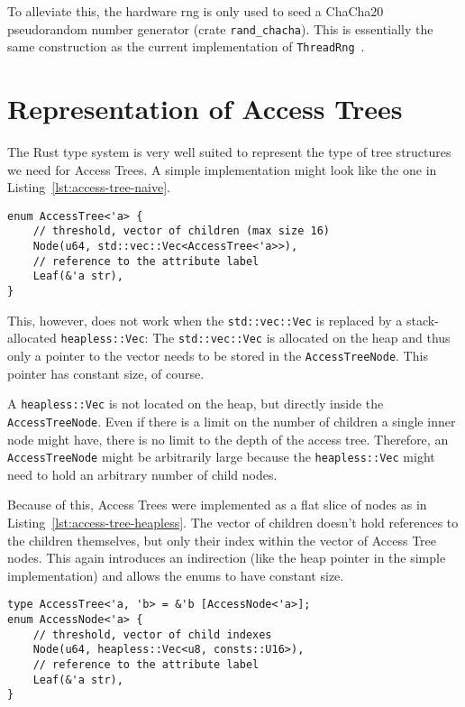 To alleviate this, the hardware \acrshort{rng} is only used to seed a ChaCha20 pseudorandom number generator (crate \texttt{rand\_chacha}).
This is essentially the same construction as the current implementation of \texttt{ThreadRng}~\cite{noauthor_rust_nodate}.


\section{Representation of Access Trees}
The Rust type system is very well suited to represent the type of tree structures we need for Access Trees.
A simple implementation might look like the one in Listing~\ref{lst:access-tree-naive}. 

\begin{lstlisting}[caption={Simple Implementation of Access Trees (using the standard library)},label={lst:access-tree-naive}]
enum AccessTree<'a> {
    // threshold, vector of children (max size 16)
    Node(u64, std::vec::Vec<AccessTree<'a>>),
    // reference to the attribute label
    Leaf(&'a str),
}
\end{lstlisting}

This, however, does not work when the \texttt{std::vec::Vec} is replaced by a stack-allocated \texttt{heapless::Vec}:
The \texttt{std::vec::Vec} is allocated on the heap and thus only a pointer to the vector needs to be stored in the \texttt{AccessTreeNode}.
This pointer has constant size, of course.

A \texttt{heapless::Vec} is not located on the heap, but directly inside the \texttt{AccessTreeNode}.
Even if there is a limit on the number of children a single inner node might have, there is no limit to the depth of the access tree.
Therefore, an \texttt{AccessTreeNode} might be arbitrarily large because the \texttt{heapless::Vec} might need to hold an arbitrary number of child nodes.

Because of this, Access Trees were implemented as a flat slice of nodes as in Listing~\ref{lst:access-tree-heapless}. 
The vector of children doesn't hold references to the children themselves, but only their index within the vector of Access Tree nodes.
This again introduces an indirection (like the heap pointer in the simple implementation) and allows the enums to have constant size.

\begin{lstlisting}[caption={Refined implementation of Access Trees (works without standard library)},label={lst:access-tree-heapless}]
type AccessTree<'a, 'b> = &'b [AccessNode<'a>];
enum AccessNode<'a> {
    // threshold, vector of child indexes
    Node(u64, heapless::Vec<u8, consts::U16>),
    // reference to the attribute label
    Leaf(&'a str),
}
\end{lstlisting}